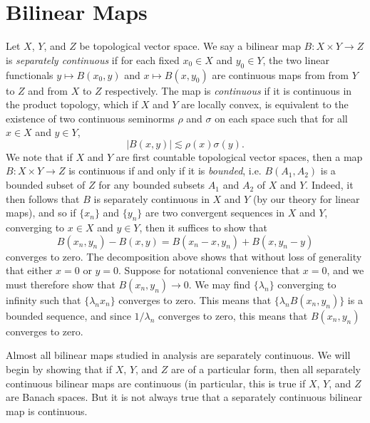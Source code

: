 \section{Bilinear Maps}

Let $X$, $Y$, and $Z$ be topological vector space. We say a bilinear map $B: X \times Y \to Z$ is \emph{separately continuous} if for each fixed $x_0 \in X$ and $y_0 \in Y$, the two linear functionals $y \mapsto B(x_0,y)$ and $x \mapsto B(x,y_0)$ are continuous maps from from $Y$ to $Z$ and from $X$ to $Z$ respectively. The map is \emph{continuous} if it is continuous in the product topology, which if $X$ and $Y$ are locally convex, is equivalent to the existence of two continuous seminorms $\rho$ and $\sigma$ on each space such that for all $x \in X$ and $y \in Y$,
%
\[ |B(x,y)| \lesssim \rho(x) \sigma(y). \]
%
We note that if $X$ and $Y$ are first countable topological vector spaces, then a map $B: X \times Y \to Z$ is continuous if and only if it is \emph{bounded}, i.e. $B(A_1,A_2)$ is a bounded subset of $Z$ for any bounded subsets $A_1$ and $A_2$ of $X$ and $Y$. Indeed, it then follows that $B$ is separately continuous in $X$ and $Y$ (by our theory for linear maps), and so if $\{ x_n \}$ and $\{ y_n \}$ are two convergent sequences in $X$ and $Y$, converging to $x \in X$ and $y \in Y$, then it suffices to show that
%
\[ B(x_n,y_n) - B(x,y) = B(x_n - x, y_n) + B(x,y_n - y) \]
%
converges to zero. The decomposition above shows that without loss of generality that either $x = 0$ or $y = 0$. Suppose for notational convenience that $x = 0$, and we must therefore show that $B(x_n,y_n) \to 0$. We may find $\{ \lambda_n \}$ converging to infinity such that $\{ \lambda_n x_n \}$ converges to zero. This means that $\{ \lambda_n B(x_n,y_n) \}$ is a bounded sequence, and since $1/\lambda_n$ converges to zero, this means that $B(x_n,y_n)$ converges to zero.

Almost all bilinear maps studied in analysis are separately continuous. We will begin by showing that if $X$, $Y$, and $Z$ are of a particular form, then all separately continuous bilinear maps are continuous (in particular, this is true if $X$, $Y$, and $Z$ are Banach spaces. But it is not always true that a separately continuous bilinear map is continuous.

